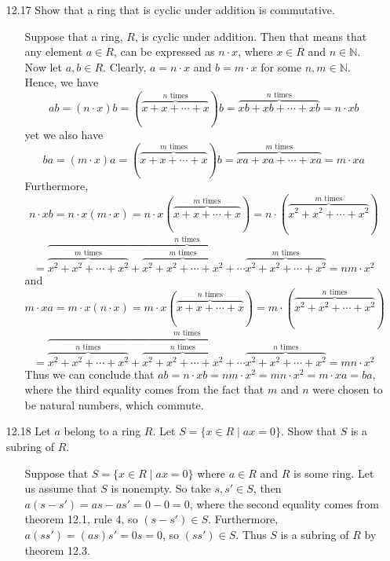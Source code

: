 \documentclass[12pt]{article}
\begin{document}
\begin{enumerate}
\item[12.17] Show that a ring that is cyclic under addition is commutative.
\begin{enumerate}
\item[] Suppose that a ring, $R$, is cyclic under addition. Then that means that any element $a \in R$, can
be expressed as $n \cdot x$, where $x \in R$ and $n \in \mathbb{N}$. Now let $a, b \in R$. Clearly, 
$a = n \cdot x$ and $b = m \cdot x$ for some $n, m \in \mathbb{N}$. Hence, we have
\[
ab = (n \cdot x)b = (\overbrace{x + x + \cdots + x}^{\mbox{$n$ times}})b = \overbrace{xb + xb + \cdots + xb}^{\mbox{$n$ times}}
= n \cdot xb
\]
yet we also have
\[
ba = (m \cdot x)a = (\overbrace{x + x + \cdots + x}^{\mbox{$m$ times}})b = \overbrace{xa + xa + \cdots + xa}^{\mbox{$m$ times}}
= m \cdot xa
\]
Furthermore, 
\[
n \cdot xb = n \cdot x(m \cdot x) = n \cdot x(\overbrace{x + x + \cdots + x}^{\mbox{$m$ times}}) = 
n \cdot (\overbrace{x^2 + x^2 + \cdots + x^2}^{\mbox{$m$ times}})
\]
\[
= \overbrace{\overbrace{x^2 + x^2 + \cdots + x^2}^{\mbox{$m$ times}} + \overbrace{x^2 + x^2 + \cdots + x^2}^{\mbox{$m$ times}}
+ \cdots \overbrace{x^2 + x^2 + \cdots + x^2}^{\mbox{$m$ times}}}^{\mbox{$n$ times}} = nm \cdot x^2
\]
and
\[
m \cdot xa = m \cdot x(n \cdot x) = m \cdot x(\overbrace{x + x + \cdots + x}^{\mbox{$n$ times}}) = 
m \cdot (\overbrace{x^2 + x^2 + \cdots + x^2}^{\mbox{$n$ times}})
\]
\[
= \overbrace{\overbrace{x^2 + x^2 + \cdots + x^2}^{\mbox{$n$ times}} + \overbrace{x^2 + x^2 + \cdots + x^2}^{\mbox{$n$ times}}
+ \cdots \overbrace{x^2 + x^2 + \cdots + x^2}^{\mbox{$n$ times}}}^{\mbox{$m$ times}} = mn \cdot x^2
\]
Thus we can conclude that $ab = n \cdot xb = nm \cdot x^2 = mn \cdot x^2 = m \cdot xa = ba$, where the
third equality comes from the fact that $m$ and $n$ were chosen to be natural numbers, which commute.
\end{enumerate}

\item[12.18] Let $a$ belong to a ring $R$. Let $S = \{ x \in R \mid ax = 0 \}$. Show that $S$ is a subring of
$R$.
\begin{enumerate}
\item[] Suppose that $S = \{ x \in R \mid ax = 0 \}$ where $a \in R$ and $R$ is some ring. Let us assume
that $S$ is nonempty. So take $s, s' \in S$, then $a(s - s') = as - as' = 0 - 0 = 0$, where the second
equality comes from theorem 12.1, rule 4, so $(s - s') \in S$. Furthermore, $a(ss') = (as)s' = 0s = 0$, 
so $(ss') \in S$. Thus $S$ is a subring of $R$ by theorem 12.3.
\end{enumerate}


\end{enumerate}
\end{document}
